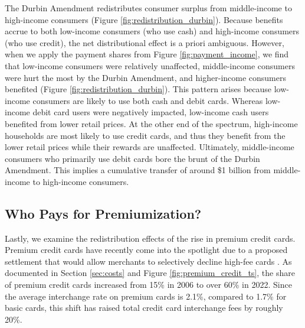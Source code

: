 \documentclass[11pt,english]{article}
\theoremstyle{remark}
\begin{document}
The Durbin Amendment redistributes consumer surplus from middle-income to high-income consumers (Figure \ref{fig:redistribution_durbin}).
Because benefits accrue to both low-income consumers (who use cash) and high-income consumers (who use credit), the net distributional effect is a priori ambiguous.
However, when we apply the payment shares from Figure \ref{fig:payment_income}, we find that low-income consumers were relatively unaffected, middle-income consumers were hurt the most by the Durbin Amendment, and higher-income consumers benefited (Figure \ref{fig:redistribution_durbin}).
This pattern arises because low-income consumers are likely to use both cash and debit cards.
Whereas low-income debit card users were negatively impacted, low-income cash users benefited from lower retail prices.
At the other end of the spectrum, high-income households are most likely to use credit cards, and thus they benefit from the lower retail prices while their rewards are unaffected.
Ultimately, middle-income consumers who primarily use debit cards bore the brunt of the Durbin Amendment.
This implies a cumulative transfer of around \$1 billion from middle-income to high-income consumers.

\subsection{Who Pays for Premiumization?}

Lastly, we examine the redistribution effects of the rise in premium credit cards.
Premium credit cards have recently come into the spotlight due to a proposed settlement that would allow merchants to selectively decline high-fee cards \citep{Andriotis2025}.
As documented in Section \ref{sec:costs} and Figure \ref{fig:premium_credit_ts}, the share of premium credit cards increased from 15\% in 2006 to over 60\% in 2022.
Since the average interchange rate on premium cards is 2.1\%, compared to 1.7\% for basic cards, this shift has raised total credit card interchange fees by roughly 20\%.
\end{document}
